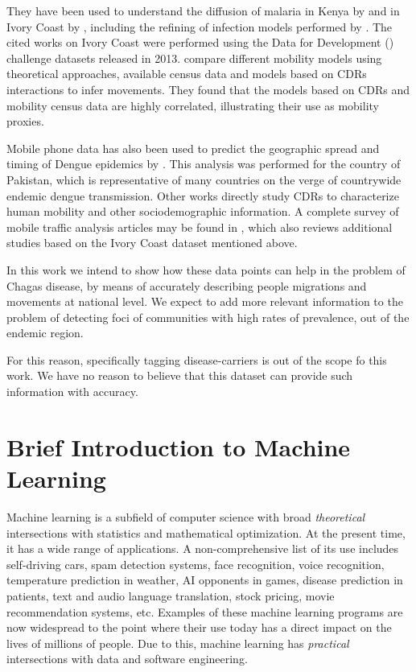 They have been used to understand the diffusion of malaria in Kenya by \cite{wesolowski2012quantifying} and in Ivory Coast by \cite{enns2013human}, including the refining of infection models performed by \cite{chunara2013large}. The cited works on Ivory Coast were performed using the Data for Development (\cite{d4d}) challenge datasets released in 2013. \cite{tizzoni2014use} compare different mobility models using theoretical approaches, available census data and models based on CDRs interactions to infer movements. They found that the models based on CDRs and mobility census data are highly correlated, illustrating their use as mobility proxies.

Mobile phone data has also been used to predict the geographic spread and timing of Dengue epidemics by \cite{wesolowski2015impact}. This analysis was performed for the country of Pakistan, which is representative of many countries on the verge of countrywide endemic dengue transmission. Other works directly study CDRs to characterize human mobility and other sociodemographic information. A complete survey of mobile traffic analysis articles may be found in \cite{naboulsi2015mobile}, which also reviews additional studies based on the Ivory Coast dataset mentioned above.

In this work we intend to show how these data points can help in the problem of Chagas disease, by means of accurately describing people migrations and movements at national level.
We expect to add more relevant information to the problem of detecting foci of communities with high rates of prevalence, out of the endemic region.

For this reason, specifically tagging disease-carriers is out of the scope fo this work. 
We have no reason to believe that this dataset can provide such information with accuracy.

\section{Brief Introduction to Machine Learning}

Machine learning is a subfield of computer science with broad \textit{theoretical} intersections with statistics and mathematical optimization. At the present time, it has a wide range of applications. A non-comprehensive list of its use includes self-driving cars, spam detection systems, face recognition, voice recognition, temperature prediction in weather, AI opponents in games, disease prediction in patients, text and audio language translation, stock pricing, movie recommendation systems, etc. Examples of these machine learning programs are now widespread to the point where their use today has a direct impact on the lives of millions of people. Due to this, machine learning has \textit{practical} intersections with data and software engineering.

